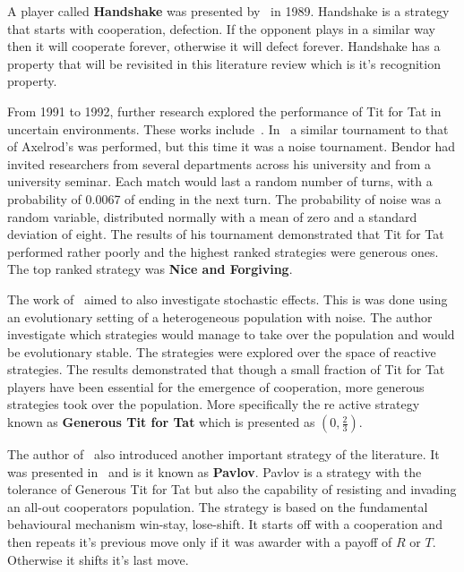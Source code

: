 \documentclass{article}
\theoremstyle{definition}
\begin{document}
A player called \textbf{Handshake} was presented by~\cite{Robson1989} in 1989.
Handshake is a strategy that starts with cooperation, defection. If the opponent
plays in a similar way then it will cooperate forever, otherwise it will defect
forever. Handshake has a property that will be revisited in this literature
review which is it's recognition property.

From 1991 to 1992, further research explored the performance of Tit for Tat in uncertain
environments. These works include~\cite{Godfray1992, Bendor1991, Nowak1992}.
In~\cite{Bendor1991} a similar tournament to that of Axelrod's was performed,
but this time it was a noise tournament. Bendor had invited researchers from several
departments across his university and from a university seminar. Each match
would last a random number of turns, with a probability of 0.0067 of ending in
the next turn. The probability of noise was a random variable, distributed normally
with a mean of zero and a standard deviation of eight. The results of his
tournament demonstrated that Tit for Tat performed rather poorly and the highest
ranked strategies were generous ones. The top ranked strategy was \textbf{Nice and Forgiving}.

The work of~\cite{Nowak1992} aimed to also investigate stochastic effects.
This is was done using an evolutionary setting of a heterogeneous population
with noise. The author investigate which strategies would manage to take over
the population and would be evolutionary stable. The strategies were explored
over the space of reactive strategies. The results demonstrated that 
though a small fraction of Tit for Tat players have been essential for the emergence
of cooperation, more generous strategies took over the population. More specifically
the re active strategy known as \textbf{Generous Tit for Tat} which is presented as
\((0, \frac{2}{3})\).

The author of~\cite{Nowak1992, nowak1989, Nowak1990} also introduced another
important strategy of the literature. It was presented in~\cite{Nowak1993} and
is it known as \textbf{Pavlov}. Pavlov is a strategy with the tolerance of Generous Tit for Tat
but also the capability of resisting and invading an all-out cooperators population.
The strategy is based on the fundamental behavioural mechanism win-stay,
lose-shift. It starts off with a cooperation and then repeats it's previous move
only if it was awarder with a payoff of \(R\) or \(T\). Otherwise it shifts
it's last move.
 
\end{document}
